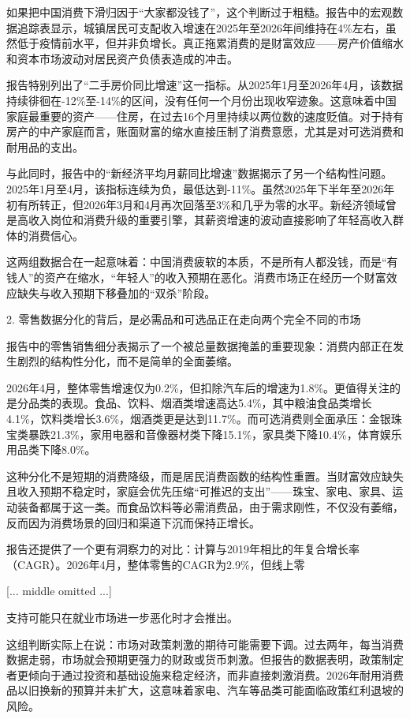 \documentclass[11pt]{ctexart}
\begin{document}
如果把中国消费下滑归因于“大家都没钱了”，这个判断过于粗糙。报告中的宏观数据追踪表显示，城镇居民可支配收入增速在2025年至2026年间维持在4\%左右，虽然低于疫情前水平，但并非负增长。真正拖累消费的是财富效应——房产价值缩水和资本市场波动对居民资产负债表造成的冲击。

报告特别列出了“二手房价同比增速”这一指标。从2025年1月至2026年4月，该数据持续徘徊在-12\%至-14\%的区间，没有任何一个月份出现收窄迹象。这意味着中国家庭最重要的资产——住房，在过去16个月里持续以两位数的速度贬值。对于持有房产的中产家庭而言，账面财富的缩水直接压制了消费意愿，尤其是对可选消费和耐用品的支出。

与此同时，报告中的“新经济平均月薪同比增速”数据揭示了另一个结构性问题。2025年1月至4月，该指标连续为负，最低达到-11\%。虽然2025年下半年至2026年初有所转正，但2026年3月和4月再次回落至3\%和几乎为零的水平。新经济领域曾是高收入岗位和消费升级的重要引擎，其薪资增速的波动直接影响了年轻高收入群体的消费信心。

这两组数据合在一起意味着：中国消费疲软的本质，不是所有人都没钱，而是“有钱人”的资产在缩水，“年轻人”的收入预期在恶化。消费市场正在经历一个财富效应缺失与收入预期下移叠加的“双杀”阶段。

2. 零售数据分化的背后，是必需品和可选品正在走向两个完全不同的市场

报告中的零售销售细分表揭示了一个被总量数据掩盖的重要现象：消费内部正在发生剧烈的结构性分化，而不是简单的全面萎缩。

2026年4月，整体零售增速仅为0.2\%，但扣除汽车后的增速为1.8\%。更值得关注的是分品类的表现。食品、饮料、烟酒类增速高达5.4\%，其中粮油食品类增长4.1\%，饮料类增长3.6\%，烟酒类更是达到11.7\%。而可选消费则全面承压：金银珠宝类暴跌21.3\%，家用电器和音像器材类下降15.1\%，家具类下降10.4\%，体育娱乐用品类下降8.0\%。

这种分化不是短期的消费降级，而是居民消费函数的结构性重置。当财富效应缺失且收入预期不稳定时，家庭会优先压缩“可推迟的支出”——珠宝、家电、家具、运动装备都属于这一类。而食品饮料等必需消费品，由于需求刚性，不仅没有萎缩，反而因为消费场景的回归和渠道下沉而保持正增长。

报告还提供了一个更有洞察力的对比：计算与2019年相比的年复合增长率（CAGR）。2026年4月，整体零售的CAGR为2.9\%，但线上零

[... middle omitted ...]

支持可能只在就业市场进一步恶化时才会推出。

这组判断实际上在说：市场对政策刺激的期待可能需要下调。过去两年，每当消费数据走弱，市场就会预期更强力的财政或货币刺激。但报告的数据表明，政策制定者更倾向于通过投资和基础设施来稳定经济，而非直接刺激消费。2026年耐用消费品以旧换新的预算并未扩大，这意味着家电、汽车等品类可能面临政策红利退坡的风险。
\end{document}
